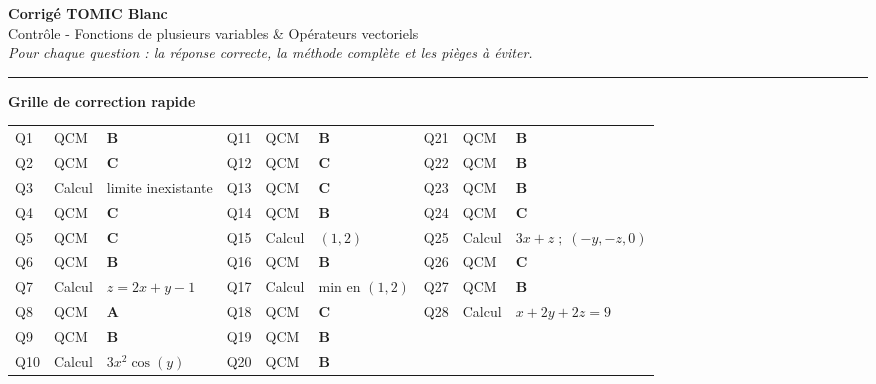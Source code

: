 \documentclass[11pt,a4paper]{article}
\begin{document}
\begin{center}
  {\Large\bfseries\color{bleutexte} Corrigé TOMIC Blanc}\\[4pt]
  {\large Contrôle - Fonctions de plusieurs variables \& Opérateurs vectoriels}\\[6pt]
  {\small\itshape
    Pour chaque question : la réponse correcte, la méthode complète et les pièges à éviter.}
\end{center}

\vspace{2pt}
\noindent\rule{\linewidth}{0.6pt}
\vspace{4pt}

\begin{notebox}
\textbf{Grille de correction rapide}\\[4pt]
\begin{tabular}{@{}lll@{\quad}lll@{\quad}lll@{}}
Q1  & QCM    & \textbf{B}                          &
Q11 & QCM    & \textbf{B}                          &
Q21 & QCM    & \textbf{B}                          \\
Q2  & QCM    & \textbf{C}                          &
Q12 & QCM    & \textbf{C}                          &
Q22 & QCM    & \textbf{B}                          \\
Q3  & Calcul & limite inexistante                  &
Q13 & QCM    & \textbf{C}                          &
Q23 & QCM    & \textbf{B}                          \\
Q4  & QCM    & \textbf{C}                          &
Q14 & QCM    & \textbf{B}                          &
Q24 & QCM    & \textbf{C}                          \\
Q5  & QCM    & \textbf{C}                          &
Q15 & Calcul & $(1,2)$                             &
Q25 & Calcul & $3x+z\;;\;(-y,-z,0)$               \\
Q6  & QCM    & \textbf{B}                          &
Q16 & QCM    & \textbf{B}                          &
Q26 & QCM    & \textbf{C}                          \\
Q7  & Calcul & $z=2x+y-1$                         &
Q17 & Calcul & min en $(1,2)$                      &
Q27 & QCM    & \textbf{B}                          \\
Q8  & QCM    & \textbf{A}                          &
Q18 & QCM    & \textbf{C}                          &
Q28 & Calcul & $x+2y+2z=9$                        \\
Q9  & QCM    & \textbf{B}                          &
Q19 & QCM    & \textbf{B}                          \\
Q10 & Calcul & $3x^2\cos(y)$                       &
Q20 & QCM    & \textbf{B}                          \\
\end{tabular}
\end{notebox}
\end{document}
